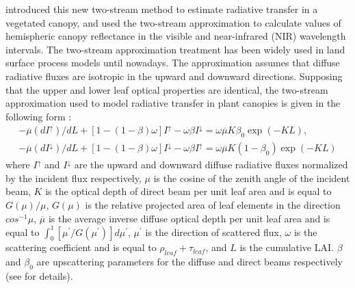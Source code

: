 \citet{Dickinson1983} introduced this new two-stream method to estimate radiative transfer in a vegetated canopy, and \citet{Sellers1985} used the two-stream approximation to calculate values of hemispheric canopy reflectance in the visible and near-infrared (NIR) wavelength intervals. The two-stream approximation treatment has been widely used in land surface process models until nowadays.
The approximation assumes that diffuse radiative fluxes are isotropic in the upward and downward directions. Supposing that the upper and lower leaf optical properties are identical, the two-stream approximation used to model radiative transfer in plant canopies is given in the following form \citep{Dickinson1983,Sellers1985}:
\begin{equation}
\begin{gathered}
-\overline{\mu}(dI^{\uparrow})/dL + [1 - (1 - \beta)\omega]I^{\uparrow} - \omega \beta I^{\downarrow} = \omega \overline{\mu} K \beta_0 \exp{(-KL)},\\
-\overline{\mu}(dI^{\downarrow})/dL + [1 - (1 - \beta)\omega]I^{\downarrow} - \omega \beta I^{\uparrow} = \omega \overline{\mu} K (1-\beta_0) \exp{(-KL)}
\end{gathered}
\end{equation}\label{eq:two_stream}
\noindent where $I^{\uparrow}$ and $I^{\downarrow}$ are the upward and downward diffuse radiative fluxes normalized by the incident flux respectively, $\mu$ is the cosine of the zenith angle of the incident beam, $K$ is the optical depth of direct beam per unit leaf area and is equal to $G(\mu)/\mu$, $G(\mu)$ is the relative projected area of leaf elements in the direction $cos^{-1}\mu$, $\overline{\mu}$ is the average inverse diffuse optical depth per unit leaf area and is equal to $\int_{0}^{1}[\mu^{\prime}/G(\mu^{\prime})]d\mu^{\prime}$, $\mu^{\prime}$ is the direction of scattered flux, $\omega$ is the scattering coefficient and is equal to $\rho_{leaf} + \tau_{leaf}$, and $L$ is the cumulative LAI. $\beta$ and $\beta_0$ are upscattering parameters for the diffuse and direct beams respectively (see \citet{Sellers1985} for details). 

